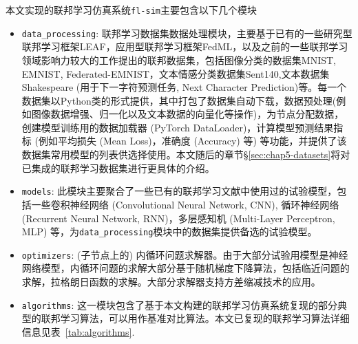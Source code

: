 本文实现的联邦学习仿真系统\texttt{fl-sim}主要包含以下几个模块
\begin{itemize}
    \item \texttt{data\_processing}: 联邦学习数据集数据处理模块，主要基于已有的一些研究型联邦学习框架LEAF\cite{caldas2018_leaf}，应用型联邦学习框架FedML\cite{he_2020_fedml}，以及之前的一些联邦学习领域影响力较大的工作\cite{mcmahan2017fed_avg,sahu2018fedprox,reddi2020fed_opt}提出的联邦数据集，包括图像分类的数据集MNIST\cite{Lecun_1998_mnist}, EMNIST\cite{cohen2017emnist}, Federated-EMNIST\cite{caldas2018_leaf,sahu2018fedprox}，文本情感分类数据集Sent140\cite{sent140,caldas2018_leaf},文本数据集Shakespeare (用于下一字符预测任务, Next Character Prediction)\cite{mcmahan2017fed_avg,caldas2018_leaf}等。每一个数据集以Python类的形式提供，其中打包了数据集自动下载，数据预处理(例如图像数据增强、归一化以及文本数据的向量化等操作)，为节点分配数据，创建模型训练用的数据加载器 (PyTorch DataLoader)，计算模型预测结果指标 (例如平均损失 (Mean Loss)，准确度 (Accuracy) 等) 等功能，并提供了该数据集常用模型的列表供选择使用。本文随后的章节\S\ref{sec:chap5-datasets}将对已集成的联邦学习数据集进行更具体的介绍。
    \item \texttt{models}: 此模块主要聚合了一些已有的联邦学习文献\cite{mcmahan2017fed_avg,zhang2020fedpd,sahu2018fedprox,Ghosh_2022_cfl,he_2020_fedml}中使用过的试验模型，包括一些卷积神经网络 (Convolutional Neural Network, CNN), 循环神经网络 (Recurrent Neural Network, RNN)，多层感知机 (Multi-Layer Perceptron, MLP) 等，为\texttt{data\_processing}模块中的数据集提供备选的试验模型。
    \item \texttt{optimizers}: (子节点上的) 内循环问题求解器。由于大部分试验用模型是神经网络模型，内循环问题的求解大部分基于随机梯度下降算法，包括临近问题的求解，拉格朗日函数的求解。大部分求解器支持方差缩减技术的应用。
    \item \texttt{algorithms}: 这一模块包含了基于本文构建的联邦学习仿真系统复现的部分典型的联邦学习算法，可以用作基准对比算法。本文已复现的联邦学习算法详细信息见表~\ref{tab:algorithms}.
\end{itemize}



